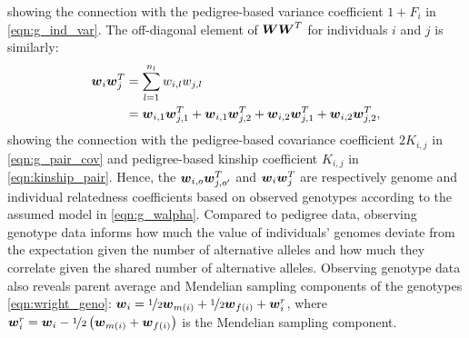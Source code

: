 %
showing the connection with the pedigree-based variance coefficient $1 + F_i$
in \eqref{eqn:g_ind_var}.
%
The off-diagonal element of $\boldsymbol{W}\boldsymbol{W}^T$ for individuals
$i$ and $j$ is similarly:
%
\begin{align} \label{eqn:WWT0_pair}
  \boldsymbol{w}_i\boldsymbol{w}_j^T & = \sum_{l=1}^{n_l} w_{i,l} w_{j,l} \notag \\
                           & = \boldsymbol{w}_{i,1}\boldsymbol{w}_{j,1}^T + \boldsymbol{w}_{i,1}\boldsymbol{w}_{j,2}^T + \boldsymbol{w}_{i,2}\boldsymbol{w}_{j,1}^T + \boldsymbol{w}_{i,2}\boldsymbol{w}_{j,2}^T,
\end{align}
%
showing the connection with the pedigree-based covariance coefficient
$2K_{i,j}$ in \eqref{eqn:g_pair_cov} and pedigree-based kinship coefficient
$K_{i,j}$ in \eqref{eqn:kinship_pair}.
%
Hence, the $\boldsymbol{w}_{i,o}\boldsymbol{w}_{j,o'}^T$ and $\boldsymbol{w}_i\boldsymbol{w}_j^T$
are respectively genome and individual relatedness coefficients based on
observed genotypes according to the assumed model in \eqref{eqn:g_walpha}.
%
Compared to pedigree data, observing genotype data informs how much the
value of individuals' genomes deviate from the expectation given the number
of alternative alleles and how much they correlate given the shared number
of alternative alleles.
%
Observing genotype data also reveals parent average and Mendelian sampling
components of the genotypes \eqref{eqn:wright_geno}:
$\boldsymbol{w}_i = \nicefrac{1}{2}\boldsymbol{w}_{m(i)} + \nicefrac{1}{2}\boldsymbol{w}_{f(i)} + \boldsymbol{w}_i^r$,
where $\boldsymbol{w}_i^r = \boldsymbol{w}_i - \nicefrac{1}{2}\left(\boldsymbol{w}_{m(i)} + \boldsymbol{w}_{f(i)}\right)$
is the Mendelian sampling component.
%
%


